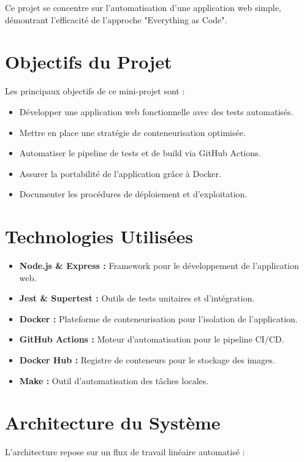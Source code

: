 \documentclass[12pt,a4paper]{report}
\begin{document}
Ce projet se concentre sur l'automatisation d'une application web simple, démontrant l'efficacité de l'approche "Everything as Code".

\chapter{Objectifs du Projet}
Les principaux objectifs de ce mini-projet sont :
\begin{itemize}
    \item Développer une application web fonctionnelle avec des tests automatisés.
    \item Mettre en place une stratégie de conteneurisation optimisée.
    \item Automatiser le pipeline de tests et de build via GitHub Actions.
    \item Assurer la portabilité de l'application grâce à Docker.
    \item Documenter les procédures de déploiement et d'exploitation.
\end{itemize}

\chapter{Technologies Utilisées}
\begin{itemize}
    \item \textbf{Node.js \& Express :} Framework pour le développement de l'application web.
    \item \textbf{Jest \& Supertest :} Outils de tests unitaires et d'intégration.
    \item \textbf{Docker :} Plateforme de conteneurisation pour l'isolation de l'application.
    \item \textbf{GitHub Actions :} Moteur d'automatisation pour le pipeline CI/CD.
    \item \textbf{Docker Hub :} Registre de conteneurs pour le stockage des images.
    \item \textbf{Make :} Outil d'automatisation des tâches locales.
\end{itemize}

\chapter{Architecture du Système}
L'architecture repose sur un flux de travail linéaire automatisé :
\end{document}
